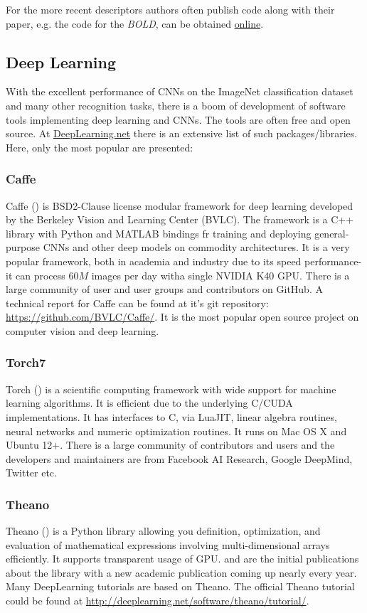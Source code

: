 {For the more recent descriptors authors often publish code along with their paper, e.g. the code for the {\em BOLD}, \cite{Balntas_2015_CVPR} can be obtained \href{http://vbalnt.io/projects/bold/}{online}.

\subsection{Deep Learning}
With the excellent performance of CNNs on the ImageNet classification dataset and many other recognition tasks, there is a boom of development of software tools implementing deep learning and CNNs. 
The tools are often free and open source. At \href{http://deeplearning.net/software_links/}{DeepLearning.net} there is an extensive list of such packages/libraries. Here, only the most popular are presented:
\subsubsection{Caffe}
Caffe (\cite{caffe_soft}) is BSD2-Clause license modular framework for deep learning developed by the Berkeley Vision and Learning Center (BVLC). The framework is a C++ library with Python and MATLAB bindings fr training and deploying general-purpose CNNs and other deep models on commodity architectures. It is a very popular framework, both in academia and industry due to its speed performance- it can process $60M$ images per day witha single NVIDIA K40 GPU. There is a large community of user and user groups and contributors on GitHub. A technical report for Caffe can be found at it's git repository: \url{https://github.com/BVLC/Caffe/}. It is the most popular open source project on computer vision and deep learning.  
\subsubsection{Torch7}
Torch (\cite{torch_soft}) is a scientific computing framework with wide support for machine learning algorithms. It is efficient due to the underlying C/CUDA implementations. It has interfaces to C, via LuaJIT, linear algebra routines, neural networks and numeric optimization routines. It runs on Mac OS X and Ubuntu 12+. There is a large community of contributors and users and the developers and maintainers are from Facebook AI Research, Google DeepMind, Twitter etc. 
\subsubsection{Theano}
Theano (\cite{theano_soft}) is a Python library allowing you definition, optimization, and evaluation of mathematical expressions involving multi-dimensional arrays efficiently. It supports transparent usage of GPU. \cite{bergstra+al:2010-scipy} and \cite{Bastien-Theano-2012} are the initial publications about the library with a new academic publication coming up nearly every year. Many DeepLearning tutorials are based on Theano. The official Theano tutorial could be found at \url{http://deeplearning.net/software/theano/tutorial/}.
}
